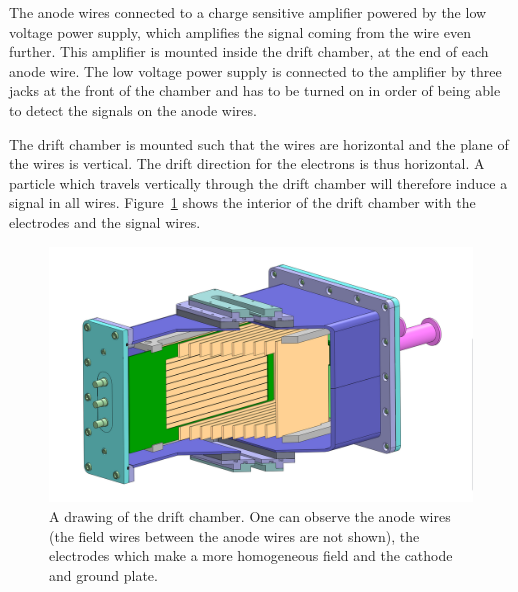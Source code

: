 \documentclass[12pt]{article}
\begin{document}
The anode wires connected to a charge sensitive amplifier powered by the low voltage power supply, which amplifies the signal coming from the wire even further. This amplifier is mounted inside the drift chamber, at the end of each anode wire. The low voltage power supply is connected to the amplifier by three jacks at the front of the chamber and has to be turned on in order of being able to detect the signals on the anode wires. 

The drift chamber is mounted such that the wires are horizontal and the plane of the wires is vertical. The drift direction for the electrons is thus horizontal. A particle which travels vertically through the drift chamber will therefore induce a signal in all wires. Figure~\ref{fig:CAD} shows the interior of the drift chamber with the electrodes and the signal wires. 

\begin{figure}[h]
\includegraphics[width=13cm]{pics/Driftkammer_Ansicht_5.png}
\centering
\caption{A drawing of the drift chamber. One can observe the anode wires (the field wires between the anode wires are not shown), the electrodes which make a more homogeneous field and the cathode and ground plate.}
\label{fig:CAD}
\end{figure}


\end{document}
